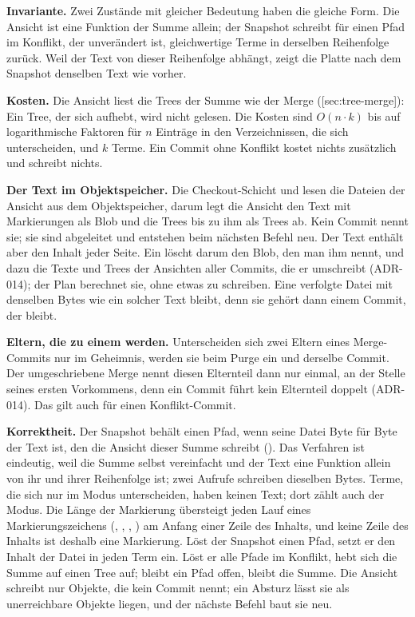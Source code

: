 {\bf Invariante.} Zwei Zustände mit gleicher Bedeutung haben die gleiche Form. Die Ansicht ist
eine Funktion der Summe allein; der Snapshot schreibt für einen Pfad im Konflikt, der unverändert
ist, gleichwertige Terme in derselben Reihenfolge zurück. Weil der Text von dieser Reihenfolge
abhängt, zeigt die Platte nach dem Snapshot denselben Text wie vorher.

{\bf Kosten.} Die Ansicht liest die Trees der Summe wie der Merge
([sec:tree-merge]): Ein Tree, der sich aufhebt, wird nicht gelesen. Die Kosten sind
$O(n \cdot k)$ bis auf logarithmische Faktoren für $n$ Einträge in den Verzeichnissen, die sich
unterscheiden, und $k$ Terme. Ein Commit ohne Konflikt kostet nichts zusätzlich und schreibt
nichts.

{\bf Der Text im Objektspeicher.} Die Checkout-Schicht und  lesen die Dateien der
Ansicht aus dem Objektspeicher, darum legt die Ansicht den Text mit Markierungen als Blob und die
Trees bis zu ihm als Trees ab. Kein Commit nennt sie; sie sind abgeleitet und entstehen beim
nächsten Befehl neu. Der Text enthält aber den Inhalt jeder Seite. Ein  löscht darum
den Blob, den man ihm nennt, und dazu die Texte und Trees der Ansichten aller
Commits, die er umschreibt (ADR-014); der Plan berechnet sie, ohne etwas zu schreiben.
Eine verfolgte Datei mit denselben Bytes wie ein solcher Text bleibt, denn sie gehört dann
einem Commit, der bleibt.

{\bf Eltern, die zu einem werden.} Unterscheiden sich zwei Eltern eines Merge-Commits nur im
Geheimnis, werden sie beim Purge ein und derselbe Commit. Der umgeschriebene Merge nennt diesen
Elternteil dann nur einmal, an der Stelle seines ersten Vorkommens, denn ein Commit führt kein
Elternteil doppelt (ADR-014). Das gilt auch für einen Konflikt-Commit.

{\bf Korrektheit.} Der Snapshot behält einen Pfad, wenn seine Datei Byte für Byte der Text ist,
den die Ansicht dieser Summe schreibt ().
Das Verfahren ist eindeutig, weil  die Summe selbst vereinfacht und der Text
eine Funktion allein von ihr und ihrer Reihenfolge ist; zwei Aufrufe schreiben dieselben Bytes.
Terme, die sich nur im Modus unterscheiden, haben keinen Text; dort zählt auch der Modus.
Die Länge der Markierung übersteigt jeden Lauf eines Markierungszeichens (\type{<}, \type{+},
\type{-}, \type{>}) am Anfang einer Zeile des Inhalts,
und keine Zeile des Inhalts ist deshalb eine Markierung.
Löst der Snapshot einen Pfad, setzt er den Inhalt der Datei in jeden Term ein.
Löst er alle Pfade im Konflikt, hebt sich die Summe auf einen Tree auf;
bleibt ein Pfad offen, bleibt die Summe.
Die Ansicht schreibt nur Objekte, die kein Commit nennt;
ein Absturz lässt sie als unerreichbare Objekte liegen, und der nächste Befehl baut sie neu.

